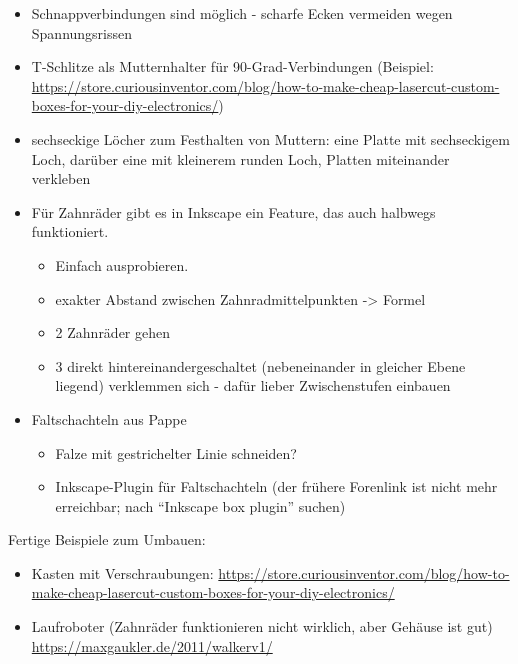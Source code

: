 \documentclass{\basedir/fablab-document}
\begin{document}
\begin{itemize}
\begin{itemize}
		\item Erfahrungswert: bei 5mm Materialdicke je 0,75\,mm Spiel links und rechts lassen
		\item wenn es trotz der hohen Dickentoleranz exakt passend sein soll: Eine bestimmte
			Acrylplatte aussuchen, Materialdicke an allen Ecken der Platte ausmessen und die Zeichnung dafür passend ändern.
	\end{itemize}
  \item Schnappverbindungen sind möglich - scharfe Ecken vermeiden wegen Spannungsrissen
  \item T-Schlitze als Mutternhalter für 90-Grad-Verbindungen (Beispiel: \url{https://store.curiousinventor.com/blog/how-to-make-cheap-lasercut-custom-boxes-for-your-diy-electronics/})
  \item sechseckige Löcher zum Festhalten von Muttern: eine Platte mit sechseckigem Loch, darüber eine mit kleinerem runden Loch, Platten miteinander verkleben
  \item Für Zahnräder gibt es in Inkscape ein Feature, das auch halbwegs funktioniert.
	\begin{itemize}
      \item Einfach ausprobieren.
      \item exakter Abstand zwischen Zahnradmittelpunkten -> Formel %
      \item 2 Zahnräder gehen
      \item 3 direkt hintereinandergeschaltet (nebeneinander in gleicher Ebene liegend) verklemmen sich - dafür lieber Zwischenstufen einbauen
	\end{itemize}
  \item Faltschachteln aus Pappe
	\begin{itemize}
		\item Falze mit gestrichelter Linie schneiden?
		\item Inkscape-Plugin für Faltschachteln (der frühere Forenlink ist nicht mehr erreichbar; nach \enquote{Inkscape box plugin} suchen)
	\end{itemize}
\end{itemize}

Fertige Beispiele zum Umbauen:
\begin{itemize}
  \item Kasten mit Verschraubungen: \url{https://store.curiousinventor.com/blog/how-to-make-cheap-lasercut-custom-boxes-for-your-diy-electronics/}
  \item Laufroboter (Zahnräder funktionieren nicht wirklich, aber Gehäuse ist gut) \url{https://maxgaukler.de/2011/walkerv1/}
\end{itemize}
\end{document}
